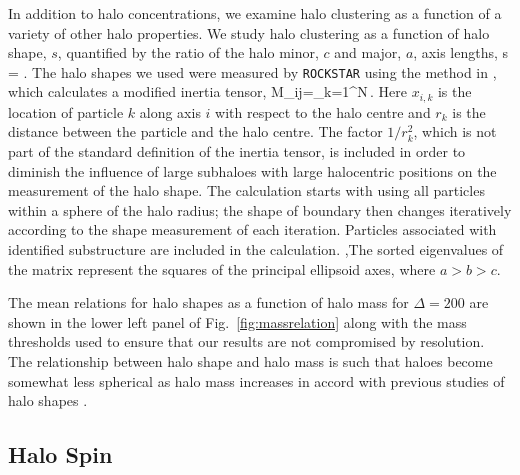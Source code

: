 \documentclass[usenatbib,fleqn]{mnras}
\begin{document}
In addition to halo concentrations, we examine halo clustering as a function of a variety of other halo properties. We study halo clustering as a function of halo shape, $s$, quantified by the ratio of the halo minor, $c$ and major, $a$, axis lengths, 
%
\beq
s = .
\eeq
%
The halo shapes we used were measured by {\tt ROCKSTAR} using the method in \cite{allgood_etal06}, which calculates a modified inertia tensor,
\beq
M_{ij}=\sum\limits_{k=1}^{N}\,.
\eeq
Here $x_{i,k}$ is the location of particle $k$ along axis $i$ with respect to the halo centre and $r_{k}$ is the distance between the particle and the halo centre. The factor $1/r_{k}^2$, which is not part of the standard definition of the inertia tensor, is included in order to diminish the influence of large subhaloes with large halocentric positions on the measurement of the halo shape. The calculation starts with using all particles within a sphere of the halo radius; the shape of boundary then changes iteratively according to the shape measurement of each iteration. Particles associated with identified substructure are included in the calculation. ,The sorted eigenvalues of the matrix represent the squares of the principal ellipsoid axes, where $a > b > c$. 
%
%
%

The mean relations for halo shapes as a function of halo mass for $\Delta=200$ are shown in the lower left panel of Fig.~\ref{fig:massrelation} along with the mass thresholds used to ensure that our results are not compromised by resolution. The relationship between halo shape and halo mass is such that haloes become somewhat less spherical as halo mass increases in accord with previous studies of halo shapes \citep[e.g.,][]{jing_suto02,allgood_etal06}.

\subsection{Halo Spin}
\end{document}

